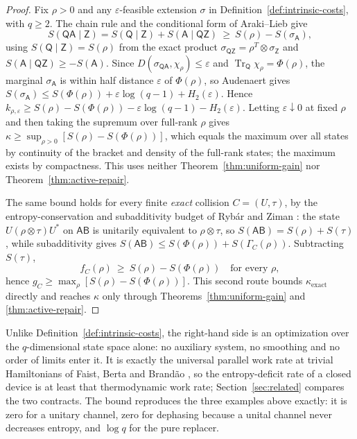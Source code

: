 \documentclass[11pt,a4paper]{article}
\numberwithin{equation}{section}
\theoremstyle{plain}
\theoremstyle{definition}
\DeclareMathOperator{\Tr}{Tr}
\newcommand{\rg}[1]{\mathsf{#1}}
\newcommand{\Dist}{D}                      %
\newcommand{\kexact}{\kappa_{\mathrm{exact}}}
\begin{document}
\begin{proof}
Fix $\rho>0$ and any $\varepsilon$-feasible extension $\sigma$ in
Definition~\ref{def:intrinsic-costs}, with $q\ge 2$. The chain rule and the
conditional form of Araki--Lieb give
\[
S(\rg{Q}\rg{A}\mid\rg{Z})=S(\rg{Q}\mid\rg{Z})+S(\rg{A}\mid\rg{Q}\rg{Z})
\ \ge\ S(\rho)-S(\sigma_{\rg{A}}),
\]
using $S(\rg{Q}\mid\rg{Z})=S(\rho)$ from the exact product
$\sigma_{\rg{Q}\rg{Z}}=\rho^{T}\otimes\sigma_{\rg{Z}}$ and
$S(\rg{A}\mid\rg{Q}\rg{Z})\ge-S(\rg{A})$. Since
$\Dist(\sigma_{\rg{Q}\rg{A}},\chi_\rho)\le\varepsilon$ and
$\Tr_{\rg{Q}}\chi_\rho=\Phi(\rho)$, the marginal $\sigma_{\rg{A}}$ is within
half distance $\varepsilon$ of $\Phi(\rho)$, so Audenaert
\cite[Theorem 1]{Audenaert2007} gives
$S(\sigma_{\rg{A}})\le S(\Phi(\rho))+\varepsilon\log(q-1)+H_2(\varepsilon)$.
Hence $k_{\rho,\varepsilon}\ge S(\rho)-S(\Phi(\rho))-\varepsilon\log(q-1)
-H_2(\varepsilon)$. Letting $\varepsilon\downarrow 0$ at fixed $\rho$ and then
taking the supremum over full-rank $\rho$ gives
$\kappa\ge\sup_{\rho>0}[S(\rho)-S(\Phi(\rho))]$, which equals the maximum over
all states by continuity of the bracket and density of the full-rank states;
the maximum exists by compactness. This uses neither
Theorem~\ref{thm:uniform-gain} nor Theorem~\ref{thm:active-repair}.

The same bound holds for every finite \emph{exact} collision $C=(U,\tau)$, by
the entropy-conservation and subadditivity budget of Ryb\'ar and Ziman
\cite[section III, Eq.~(3.7)]{RybarZiman2008}: the state
$U(\rho\otimes\tau)U^*$ on $\rg{A}\rg{B}$ is unitarily equivalent to
$\rho\otimes\tau$, so $S(\rg{A}\rg{B})=S(\rho)+S(\tau)$, while subadditivity
gives $S(\rg{A}\rg{B})\le S(\Phi(\rho))+S(\Gamma_C(\rho))$. Subtracting
$S(\tau)$,
\[
f_C(\rho)\ \ge\ S(\rho)-S(\Phi(\rho))\quad\text{for every }\rho,
\]
hence $g_C\ge\max_\rho[S(\rho)-S(\Phi(\rho))]$. This second route bounds
$\kexact$ directly and reaches $\kappa$ only through
Theorems~\ref{thm:uniform-gain} and \ref{thm:active-repair}.
\end{proof}

Unlike Definition~\ref{def:intrinsic-costs}, the right-hand side is an
optimization over the $q$-dimensional state space alone: no auxiliary system,
no smoothing and no order of limits enter it. It is exactly the universal
parallel work rate at trivial Hamiltonians of Faist, Berta and Brand\~ao
\cite[Theorem 5.1 and Eq.~(5.4)]{Faist2019}, so the entropy-deficit rate of a
closed device is at least that thermodynamic work rate;
Section~\ref{sec:related} compares the two contracts. The bound reproduces the
three examples above exactly: it is zero for a unitary channel, zero for
dephasing because a unital channel never decreases entropy, and $\log q$ for
the pure replacer.
\end{document}
